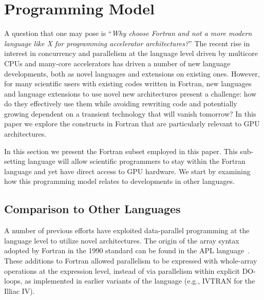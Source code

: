 \section{Programming Model}

A question that one may pose is ``\emph{Why choose Fortran and not a more modern
  language like X for programming accelerator architectures?}''  The recent rise
in interest in concurrency and parallelism at the language level driven by
multicore CPUs and many-core accelerators has driven a number of new language
developments, both as novel languages and extensions on existing ones.  However,
for many scientific users with existing codes written in Fortran, new languages
and language extensions to use novel new architectures present a challenge: how
do they effectively use them while avoiding rewriting code and potentially
growing dependent on a transient technology that will vanish tomorrow?
In this paper we explore the constructs in Fortran that are particularly
relevant to GPU architectures.

In this section we present the Fortran subset employed in this paper.  This
sub-setting language will allow scientific programmers to stay within the Fortran
language and yet have direct access to GPU hardware.  We start by examining how this
programming model relates to developments in other languages.


\subsection{Comparison to Other Languages}

A number of previous efforts have exploited data-parallel programming at the
language level to utilize novel architectures.
The origin of the array syntax adopted by Fortran in the 1990
standard can be found in the APL language~\cite{iverson79apl}.  These additions
to Fortran allowed parallelism to be expressed with whole-array operations at
the expression level, instead of via parallelism within explicit DO-loops, as
implemented in earlier variants of the language (e.g.,
IVTRAN for the Illiac IV).

